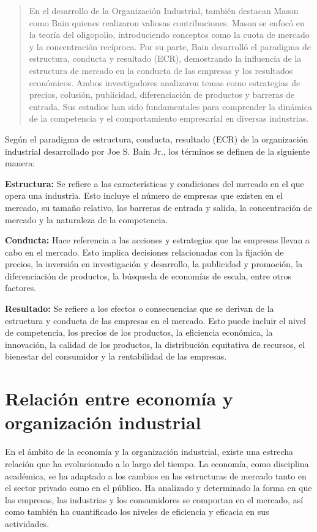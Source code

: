 \documentclass[
  doc,
  floatsintext,
  longtable,
  a4paper,
  nolmodern,
  notxfonts,
  notimes,
  colorlinks=true,linkcolor=blue,citecolor=blue,urlcolor=blue]{apa7}
\begin{document}
\begin{quote}
En el desarrollo de la Organización Industrial, también destacan Mason
como Bain quienes realizaron valiosas contribuciones. Mason se enfocó en
la teoría del oligopolio, introduciendo conceptos como la cuota de
mercado y la concentración recíproca. Por su parte, Bain desarrolló el
paradigma de estructura, conducta y resultado (ECR), demostrando la
influencia de la estructura de mercado en la conducta de las empresas y
los resultados económicos. Ambos investigadores analizaron temas como
estrategias de precios, colusión, publicidad, diferenciación de
productos y barreras de entrada. Sus estudios han sido fundamentales
para comprender la dinámica de la competencia y el comportamiento
empresarial en diversas industrias.
\end{quote}

Según el paradigma de estructura, conducta, resultado (ECR) de la
organización industrial desarrollado por Joe S. Bain Jr., los términos
se definen de la siguiente manera:

\textbf{Estructura:} Se refiere a las características y condiciones del
mercado en el que opera una industria. Esto incluye el número de
empresas que existen en el mercado, su tamaño relativo, las barreras de
entrada y salida, la concentración de mercado y la naturaleza de la
competencia.

\textbf{Conducta:} Hace referencia a las acciones y estrategias que las
empresas llevan a cabo en el mercado. Esto implica decisiones
relacionadas con la fijación de precios, la inversión en investigación y
desarrollo, la publicidad y promoción, la diferenciación de productos,
la búsqueda de economías de escala, entre otros factores.

\textbf{Resultado:} Se refiere a los efectos o consecuencias que se
derivan de la estructura y conducta de las empresas en el mercado. Esto
puede incluir el nivel de competencia, los precios de los productos, la
eficiencia económica, la innovación, la calidad de los productos, la
distribución equitativa de recursos, el bienestar del consumidor y la
rentabilidad de las empresas.

\section{Relación entre economía y organización
industrial}\label{relaciuxf3n-entre-economuxeda-y-organizaciuxf3n-industrial}

En el ámbito de la economía y la organización industrial, existe una
estrecha relación que ha evolucionado a lo largo del tiempo. La
economía, como disciplina académica, se ha adaptado a los cambios en las
estructuras de mercado tanto en el sector privado como en el público. Ha
analizado y determinado la forma en que las empresas, las industrias y
los consumidores se comportan en el mercado, así como también ha
cuantificado los niveles de eficiencia y eficacia en sus actividades.
\end{document}
